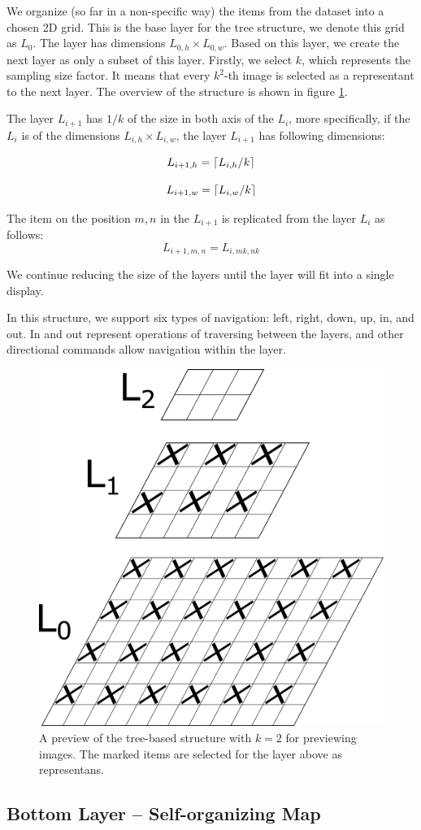 We organize (so far in a non-specific way) the items from the dataset into a chosen 2D grid. This is the base layer for the tree structure, we denote this grid as $L_0$. The layer has dimensions $L_{0, h}\times L_{0, w}$. Based on this layer, we create the next layer as only a subset of this layer. Firstly, we select $k$, which represents the sampling size factor. It means that every $k^2$-th image is selected as a representant to the next layer. The overview of the structure is shown in figure \ref{fig:tree_structure}. 

The layer $L_{i+1}$ has $1/k$ of the size in both axis of the $L_i$, more specifically, if the $L_i$ is of the dimensions $L_{i,h} \times L_{i,w}$, the layer $L_{i+1}$ has following dimensions:

$$
    L_{i+1, h} = \ceil*{L_{i, h} / k}
$$

$$
    L_{i+1, w} = \ceil*{L_{i, w} / k}
$$


The item on the position $m, n$ in the $L_{i+1}$ is replicated from the layer $L_i$ as follows:
$$
    L_{i+1, m, n} = L_{i, mk, nk} 
$$

We continue reducing the size of the layers until the layer will fit into a single display.

In this structure, we support six types of navigation: left, right, down, up, in, and out. In and out represent operations of traversing between the layers, and other directional commands allow navigation within the layer. 

\begin{figure}
    \centering
    \includegraphics[width=0.3\linewidth]{img/tree-structure.pdf}
    \caption{A preview of the tree-based structure with $k = 2$ for previewing images. The marked items are selected for the layer above as representans.}
    \label{fig:tree_structure}
\end{figure}

\subsection{Bottom Layer -- Self-organizing Map}

